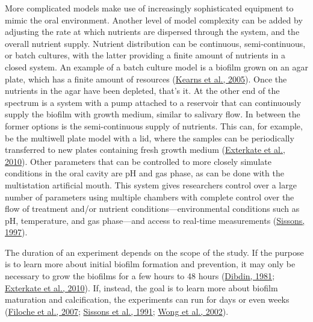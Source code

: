 \documentclass[
  b5paper,
]{book}
\begin{document}
More complicated models make use of increasingly sophisticated equipment
to mimic the oral environment. Another level of model complexity can be
added by adjusting the rate at which nutrients are dispersed through the
system, and the overall nutrient supply. Nutrient distribution can be
continuous, semi-continuous, or batch cultures, with the latter
providing a finite amount of nutrients in a closed system. An example of
a batch culture model is a biofilm grown on an agar plate, which has a
finite amount of resources
(\protect\hyperlink{ref-kearnsMasterRegulator2005}{Kearns et al.,
2005}). Once the nutrients in the agar have been depleted, that's it. At
the other end of the spectrum is a system with a pump attached to a
reservoir that can continuously supply the biofilm with growth medium,
similar to salivary flow. In between the former options is the
semi-continuous supply of nutrients. This can, for example, be the
multiwell plate model with a lid, where the samples can be periodically
transferred to new plates containing fresh growth medium
(\protect\hyperlink{ref-extercateAAA2010}{Exterkate et al., 2010}).
Other parameters that can be controlled to more closely simulate
conditions in the oral cavity are pH and gas phase, as can be done with
the multistation artificial mouth. This system gives researchers control
over a large number of parameters using multiple chambers with complete
control over the flow of treatment and/or nutrient
conditions---environmental conditions such as pH, temperature, and gas
phase---and access to real-time measurements
(\protect\hyperlink{ref-sissonsArtificialPlaque1997}{Sissons, 1997}).

The duration of an experiment depends on the scope of the study. If the
purpose is to learn more about initial biofilm formation and prevention,
it may only be necessary to grow the biofilms for a few hours to 48
hours (\protect\hyperlink{ref-dibdinDiffusionSugars1981}{Dibdin, 1981};
\protect\hyperlink{ref-extercateAAA2010}{Exterkate et al., 2010}). If,
instead, the goal is to learn more about biofilm maturation and
calcification, the experiments can run for days or even weeks
(\protect\hyperlink{ref-filocheFluorescenceAssay2007}{Filoche et al.,
2007}; \protect\hyperlink{ref-sissonsMultistationPlaque1991}{Sissons et
al., 1991}; \protect\hyperlink{ref-wongCalciumPhosphate2002}{Wong et
al., 2002}).
\end{document}
